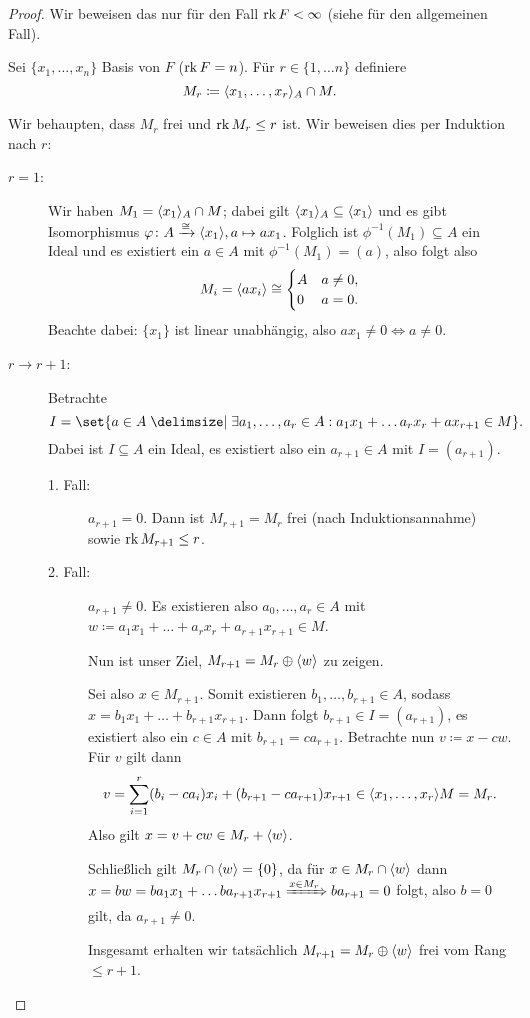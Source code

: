 \documentclass[12pt,a4paper]{scrartcl}
\theoremstyle{cplain}
\theoremstyle{cdef}
\begin{document}
\begin{proof}
	Wir beweisen das nur für den Fall $\operatorname{rk} F<\infty$ (siehe \cite[Theorem 6.1]{hungerford} für den allgemeinen Fall).
	
	Sei $\{x_1,\dots, x_n\}$ Basis von $F$ ($\operatorname{rk} F = n$). Für $r\in\{1,\dots n\}$ definiere
	\[M_r\coloneqq \langle x_1,\dots, x_r\rangle_A\cap M.\]
	
	Wir behaupten, dass $M_r$ frei und $\operatorname{rk} M_r \le r$ ist. Wir beweisen dies per Induktion nach $r$:
	\begin{description}
		\item[$r = 1$:] Wir haben $M_1 = \langle x_1\rangle_A\cap M$; dabei gilt $\langle x_1\rangle_A\subseteq \langle x_1\rangle$ und es gibt Isomorphismus $\varphi\colon A\xrightarrow{\cong} \langle x_1\rangle, a\mapsto ax_1$. Folglich ist $\phi^{-1}(M_1)\subseteq A$ ein Ideal und es existiert ein $a\in A$ mit $\phi^{-1}(M_1) = (a)$, also folgt also \[M_i = \langle ax_i\rangle \cong \begin{cases} A & a\neq 0,\\ 0& a= 0.\end{cases}\]
		Beachte dabei: $\{x_1\}$ ist linear unabhängig, also $ax_1\neq 0 \Leftrightarrow a\neq 0$.
		\item[$r\to r+1$:] Betrachte
		\[ I = \set{a\in A \given \exists a_1,\dots, a_r\in A: a_1x_1+\dots a_rx_r+ax_{r+1}\in M}. \]
		Dabei ist $I\subseteq A$ ein Ideal, es existiert also ein $a_{r+1}\in A$ mit $I = (a_{r+1})$.
		\begin{description}
			\item[1. Fall:] $a_{r+1} = 0$. Dann ist $M_{r+1} = M_r$ frei (nach Induktionsannahme) sowie $\operatorname{rk} M_{r+1}\leq r$.
			\item[2. Fall:] $a_{r+1}\neq 0$. Es existieren also $a_0,\dots, a_r\in A$ mit $w\coloneqq a_1x_1+\dots+a_rx_r+a_{r+1}x_{r+1}\in M$.
			
			Nun ist unser Ziel, $M_{r+1} = M_r\oplus \langle w\rangle$ zu zeigen.
			
			Sei also $x\in M_{r+1}$. Somit existieren $b_1,\dots, b_{r+1}\in A$, sodass $x = b_1x_1+\dots + b_{r+1}x_{r+1}$. Dann folgt $b_{r+1}\in I = (a_{r+1})$, es existiert also ein $c\in A$ mit $b_{r+1} = ca_{r+1}$. Betrachte nun $v\coloneqq x-cw$. Für $v$ gilt dann
			\[v= \sum_{i = 1}^r (b_i-ca_i)x_i+(b_{r+1}-ca_{r+1})x_{r+1}\in \langle x_1,\dots, x_r\rangle M = M_r.\]
			Also gilt $x = v+cw\in M_r+\langle w\rangle$.
			
			Schließlich gilt $M_r\cap\langle w\rangle = \{0\}$, da für $x\in M_r\cap\langle w\rangle$ dann $x = bw = ba_1x_1+\dots ba_{r+1}x_{r+1}\xRightarrow{x\in M_r} ba_{r+1} = 0$ folgt, also $b = 0$ gilt, da $a_{r+1} \neq 0$.
			
			Insgesamt erhalten wir tatsächlich $M_{r+1} = M_r\oplus \langle w\rangle$ frei vom Rang $\leq r+1$. \qedhere 
		\end{description}
	\end{description}
	
\end{proof}
\end{document}
